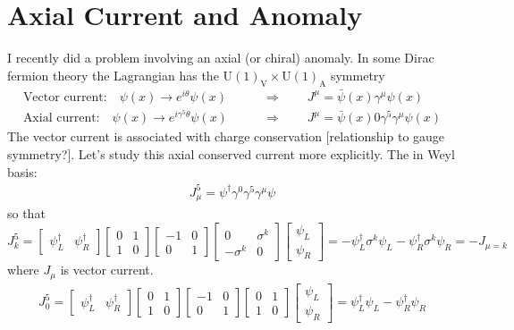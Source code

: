 \documentclass{report}
\begin{document}
\section{Axial Current and Anomaly}
I recently did a problem involving an axial (or chiral) anomaly. In some Dirac
fermion theory the Lagrangian has the $ \text{U}(1)_\text{V}\times
\text{U}(1)_\text{A} $ symmetry
\begin{align*}
	\text{Vector current:}\quad \psi(x) \rightarrow e^{i\theta}\psi(x) 
	\qquad &\Longrightarrow \qquad J^\mu = \bar{\psi}(x) \gamma^\mu \psi(x)\\
	\text{Axial current:}\quad \psi(x) \rightarrow e^{i\gamma^5\theta}\psi(x) 
	\qquad &\Longrightarrow \qquad J^\mu = \bar{\psi}(x) 0\gamma^5 \gamma^\mu \psi(x)
\end{align*}
The vector current is associated with charge conservation {\color{myred} [relationship to 
gauge symmetry?]}.  
Let's study this axial conserved current more explicitly. The in Weyl basis:
\begin{align*}
	J^5_\mu = \psi^\dagger \gamma^0 \gamma^5 \gamma^\mu \psi 
\end{align*}
so that
\begin{equation*}
	J^5_k 
		= \begin{bmatrix}
		\psi^\dagger_L & \psi^\dagger_R
		\end{bmatrix}
		\begin{bmatrix}
		0 & 1 \\ 1 & 0
		\end{bmatrix}
		\begin{bmatrix}
		-1 & 0 \\ 0 & 1
		\end{bmatrix}
		\begin{bmatrix}
		0 & \sigma^k \\ -\sigma^k & 0
		\end{bmatrix}
		\begin{bmatrix}
		\psi_L \\ \psi_R
		\end{bmatrix}
		= - \psi_L^\dagger \sigma^k \psi_L  - \psi_R^\dagger \sigma^k \psi_R
		= - J_{\mu = k}
\end{equation*}
where $ J_\mu $ is vector current.
\begin{align*}
	J^5_0 
		= \begin{bmatrix}
		\psi^\dagger_L & \psi^\dagger_R
		\end{bmatrix}
		\begin{bmatrix}
		0 & 1 \\ 1 & 0
		\end{bmatrix}
		\begin{bmatrix}
		-1 & 0 \\ 0 & 1
		\end{bmatrix}
		\begin{bmatrix}
		0 & 1 \\ 1 & 0
		\end{bmatrix}
		\begin{bmatrix}
		\psi_L \\ \psi_R
		\end{bmatrix}
		= \psi_L^\dagger \psi_L - \psi_R^\dagger \psi_R
\end{align*}
\end{document}
